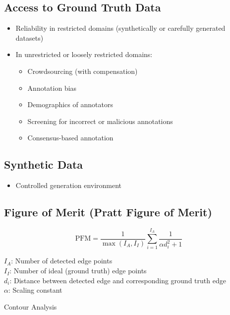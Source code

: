 \documentclass[11pt]{article}
\theoremstyle{definition}
\begin{document}
\subsection*{Access to Ground Truth Data}
\begin{itemize}
    \item Reliability in restricted domains (synthetically or carefully generated datasets)
    \item In unrestricted or loosely restricted domains:
    \begin{itemize}
        \item Crowdsourcing (with compensation)
        \item Annotation bias
        \item Demographics of annotators
        \item Screening for incorrect or malicious annotations
        \item Consensus-based annotation
    \end{itemize}
\end{itemize}

\subsection*{Synthetic Data}
\begin{itemize}
    \item Controlled generation environment
\end{itemize}

\subsection*{Figure of Merit (Pratt Figure of Merit)}

\begin{equation}
    \text{PFM} = \frac{1}{\max(I_A, I_I)} \sum_{i=1}^{I_A} \frac{1}{\alpha d_i^2 + 1}
\end{equation}

\noindent
$ I_A $: Number of detected edge points \\
$ I_I $: Number of ideal (ground truth) edge points \\
$ d_i $: Distance between detected edge and corresponding ground truth edge \\
$ \alpha $: Scaling constant


\newpage
\pagestyle{fancy}  %

Contour Analysis
\end{document}

